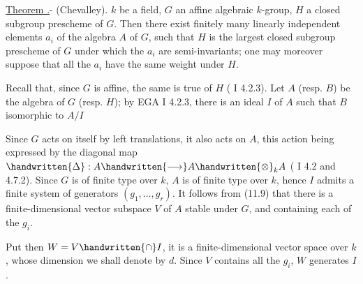 
\uline{Theorem .}- (Chevalley).  $k$ be a field, $G$ an affine algebraic $k$-group, $H$ a closed subgroup prescheme of $G$. Then there exist finitely many linearly independent elements $a_i$ of the algebra $A$ of $G$, such that $H$ is the largest closed subgroup prescheme of $G$ under which the $a_i$ are semi-invariants; one may moreover suppose that all the $a_i$ have the same  weight\deleted{)} under $H$.

Recall that, since $G$ is affine, the same is true of $H$ ( I 4.2.3). Let $A$ (resp. $B$) be the algebra of $G$ (resp. $H$); by EGA I 4.2.3, there is an ideal $I$ of $A$ such that $B$  isomorphic to $A/I$ Since $G$ acts on itself by left translations, it also acts on $A$, this action being expressed by the diagonal map $\handwritten{\Delta}:A\handwritten{\longrightarrow}A\handwritten{\otimes}_k A$ ( I 4.2 and 4.7.2). Since $G$ is of finite type over $k$, $A$ is of finite type over $k$, hence $I$  admits a finite system of generators $(g_1,\ldots,g_r)$. It follows from (11.9) that there is a finite-dimensional vector subspace $V$ of $A$  stable under $G$, and containing each of the $g_i$.

Put then $W=V\handwritten{\cap}I$, it is a finite-dimensional vector space over $k$, whose dimension we shall denote by $d$. Since $V$ contains all the $g_i$, $W$ generates  $I$.

